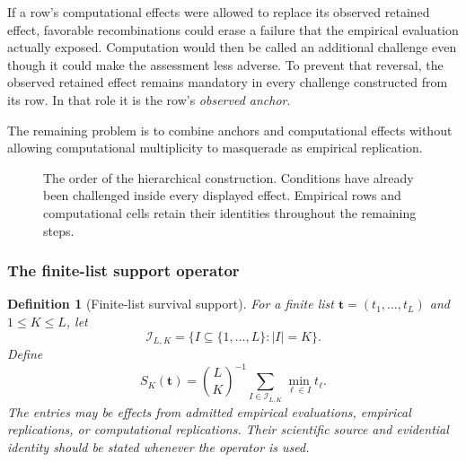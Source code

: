\documentclass[11pt]{article}
\newtheorem{definition}{Definition}
\theoremstyle{remark}
\begin{document}
If a row's computational effects were allowed to replace its observed retained
effect, favorable recombinations could erase a failure that the empirical
evaluation actually exposed. Computation would then be called an additional
challenge even though it could make the assessment less adverse. To prevent
that reversal, the observed retained effect remains mandatory in every
challenge constructed from its row. In that role it is the row's
\emph{observed anchor}.

The remaining problem is to combine anchors and computational effects without
allowing computational multiplicity to masquerade as empirical replication.

\begin{figure}[htbp]
\centering
{}
\caption{The order of the hierarchical construction. Conditions have already
been challenged inside every displayed effect. Empirical rows and
computational cells retain their identities throughout the remaining steps.}
\label{fig:hierarchy-schematic}
\end{figure}

\subsubsection{The finite-list support operator}

\begin{definition}[Finite-list survival support]
\label{def:support}
For a finite list $\mathbf t=(t_1,\ldots,t_L)$ and $1\leq K\leq L$, let
\[
\mathcal I_{L,K}
=
\{I\subseteq\{1,\ldots,L\}:|I|=K\}.
\]
Define
\begin{equation}
S_K(\mathbf t)
=
\binom{L}{K}^{-1}
\sum_{I\in\mathcal I_{L,K}}
\min_{\ell\in I}t_\ell.
\label{eq:finite-list-support}
\end{equation}
The entries may be effects from admitted empirical evaluations, empirical
replications, or computational replications. Their scientific source and
evidential identity should be stated whenever the operator is used.
\end{definition}
\end{document}
